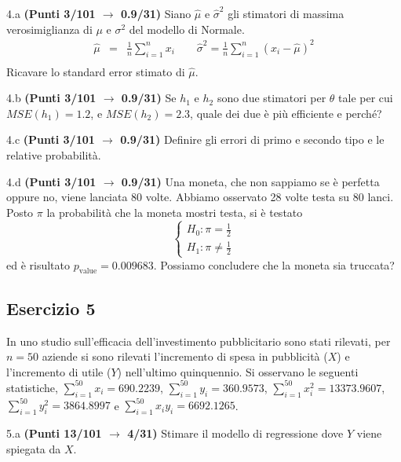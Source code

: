 \documentclass[
  11pt,
]{book}
\theoremstyle{mytheoremstyle}
\theoremstyle{mydefstyle}
\begin{document}
4.a \textbf{(Punti 3/101 \(\rightarrow\) 0.9/31)} Siano \(\hat \mu\) e \(\hat\sigma^2\) gli stimatori di massima verosimiglianza di \(\mu\) e \(\sigma^2\) del modello di Normale.
\begin{eqnarray*}
  \hat\mu &=&  \frac 1n\sum_{i=1}^nx_i \qquad \hat\sigma^2 =  \frac 1n\sum_{i=1}^n(x_i-\hat\mu)^2\\
\end{eqnarray*}
Ricavare lo standard error stimato di \(\hat\mu\).

4.b \textbf{(Punti 3/101 \(\rightarrow\) 0.9/31)} Se \(h_1\) e \(h_2\) sono due stimatori per \(\theta\) tale per cui \(MSE(h_1)=1.2\), e \(MSE(h_2)=2.3\), quale dei due è più efficiente e perché?

4.c \textbf{(Punti 3/101 \(\rightarrow\) 0.9/31)} Definire gli errori di primo e secondo tipo e le relative probabilità.

4.d \textbf{(Punti 3/101 \(\rightarrow\) 0.9/31)} Una moneta, che non sappiamo se è perfetta oppure no, viene lanciata 80 volte. Abbiamo osservato 28 volte testa su 80 lanci. Posto \(\pi\) la probabilità che la moneta mostri testa, si è testato
\[
\begin{cases}
H_0:\pi=\frac 12\\
H_1:\pi\ne\frac 12
\end{cases}
\]
ed è risultato \(p_\text{value}=0.009683\). Possiamo concludere che la moneta sia truccata?

\subsection{Esercizio 5}\label{esercizio-5-23}

In uno studio sull'efficacia dell'investimento pubblicitario sono stati rilevati, per \(n=50\) aziende si sono rilevati l'incremento di spesa in
pubblicità (\(X\)) e l'incremento di utile (\(Y\)) nell'ultimo quinquennio. Si osservano le seguenti statistiche, \(\sum_{i=1}^{50}x_i=690.2239\), \(\sum_{i=1}^{50}y_i=360.9573\),
\(\sum_{i=1}^{50}x_i^2=13373.9607\), \(\sum_{i=1}^{50}y_i^2=3864.8997\) e \(\sum_{i=1}^{50}x_iy_i=6692.1265\).

5.a \textbf{(Punti 13/101 \(\rightarrow\) 4/31)} Stimare il modello di regressione dove \(Y\) viene spiegata da \(X\).
\end{document}
